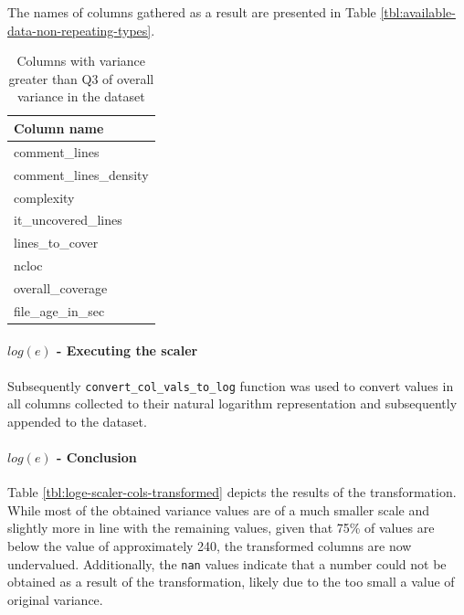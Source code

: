 The names of columns gathered as a result are presented in Table \ref{tbl:available-data-non-repeating-types}.

\begin{table}[!h]
\centering
\caption{Columns with variance greater than Q3 of overall variance in the dataset}
\label{tab:loge-scaler-cols-aboveq3}
\begin{tabular}{@{}l@{}}
\toprule
Column name \\ \midrule
comment\_lines \\
comment\_lines\_density \\
complexity \\
it\_uncovered\_lines \\
lines\_to\_cover \\
ncloc \\
overall\_coverage \\
file\_age\_in\_sec \\ \bottomrule
\end{tabular}
\end{table}

\paragraph{$log(e)$ - Executing the scaler}
Subsequently \texttt{convert\_col\_vals\_to\_log} function was used to convert values in all columns collected to their natural logarithm representation and subsequently appended to the dataset.

\paragraph{$log(e)$ - Conclusion}
Table \ref{tbl:loge-scaler-cols-transformed} depicts the results of the transformation. While most of the obtained variance values are of a much smaller scale and slightly more in line with the remaining values, given that 75\% of values are below the value of approximately 240, the transformed columns are now undervalued. 
Additionally, the \texttt{nan} values indicate that a number could not be obtained as a result of the transformation, likely due to the too small a value of original variance. 

